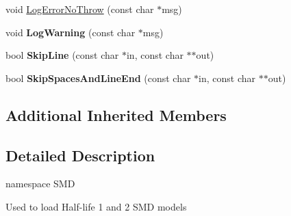 \begin{DoxyCompactItemize}
\item 
void \hyperlink{class_assimp_1_1_s_m_d_importer_a19cafa48a493bb2f472353112b7a3597}{Log\+Error\+No\+Throw} (const char $\ast$msg)
\item 
\hypertarget{class_assimp_1_1_s_m_d_importer_a21f47f7f5ee5c132be036502a4278bb3}{void {\bfseries Log\+Warning} (const char $\ast$msg)}\label{class_assimp_1_1_s_m_d_importer_a21f47f7f5ee5c132be036502a4278bb3}

\item 
\hypertarget{class_assimp_1_1_s_m_d_importer_ac3228b6e69573fddd7df5c3a9c84e9dc}{bool {\bfseries Skip\+Line} (const char $\ast$in, const char $\ast$$\ast$out)}\label{class_assimp_1_1_s_m_d_importer_ac3228b6e69573fddd7df5c3a9c84e9dc}

\item 
\hypertarget{class_assimp_1_1_s_m_d_importer_a41763f06d8b90fa3dffcef07ba0e4ee8}{bool {\bfseries Skip\+Spaces\+And\+Line\+End} (const char $\ast$in, const char $\ast$$\ast$out)}\label{class_assimp_1_1_s_m_d_importer_a41763f06d8b90fa3dffcef07ba0e4ee8}

\end{DoxyCompactItemize}
\subsection*{Additional Inherited Members}


\subsection{Detailed Description}
namespace S\+M\+D 

Used to load Half-\/life 1 and 2 S\+M\+D models 

